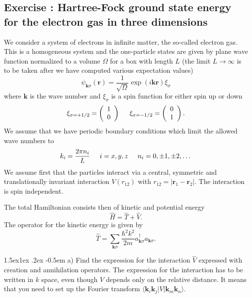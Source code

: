\documentclass[%
oneside,                 %
final,                   %
10pt]{article}
\makeatletter
\newenvironment{doconceexercise}{}{}
\newcounter{doconceexercisecounter}
\newcommand\subex{\@startsection{paragraph}{4}{\z@}%
                  {1.5ex\@plus1ex \@minus.2ex}%
                  {-0.5em}%
                  {\normalfont\normalsize\bfseries}}
\makeatother
\begin{document}
\begin{doconceexercise}

\subsection*{Exercise \thedoconceexercisecounter: Hartree-Fock ground state energy for the  electron gas in three dimensions}


We consider a system of electrons in infinite matter, the so-called electron gas. This is a homogeneous system and the one-particle states are given by plane wave function normalized to a volume $\Omega$ 
for a box with length $L$ (the limit $L\rightarrow \infty$ is to be taken after we have computed various expectation values)
\[
\psi_{\mathbf{k}\sigma}(\mathbf{r})= \frac{1}{\sqrt{\Omega}}\exp{(i\mathbf{kr})}\xi_{\sigma}
\]
where $\mathbf{k}$ is the wave number and  $\xi_{\sigma}$ is a spin function for either spin up or down
\[ 
\xi_{\sigma=+1/2}=\left(\begin{array}{c} 1 \\ 0 \end{array}\right) \hspace{0.5cm}
\xi_{\sigma=-1/2}=\left(\begin{array}{c} 0 \\ 1 \end{array}\right).
\]
We assume that we have periodic boundary conditions which limit the allowed wave numbers to
\[
k_i=\frac{2\pi n_i}{L}\hspace{0.5cm} i=x,y,z \hspace{0.5cm} n_i=0,\pm 1,\pm 2, \dots
\]
We assume first that the particles interact via a central, symmetric and translationally invariant
interaction  $V(r_{12})$ with
$r_{12}=|\mathbf{r}_1-\mathbf{r}_2|$.  The interaction is spin independent.

The total Hamiltonian consists then of kinetic and potential energy
\[
\hat{H} = \hat{T}+\hat{V}.
\]
The operator for the kinetic energy is given by
\[
\hat{T}=\sum_{\mathbf{k}\sigma}\frac{\hbar^2k^2}{2m}a_{\mathbf{k}\sigma}^{\dagger}a_{\mathbf{k}\sigma}.
\]


\subex{a)}
Find the expression for the interaction
$\hat{V}$ expressed with creation and annihilation operators.   The expression for the interaction
has to be written in  $k$ space, even though $V$ depends only on the relative distance. It means that you need to set up the Fourier transform $\langle \mathbf{k}_i\mathbf{k}_j| V | \mathbf{k}_m\mathbf{k}_n\rangle$.



\end{doconceexercise}
\end{document}
